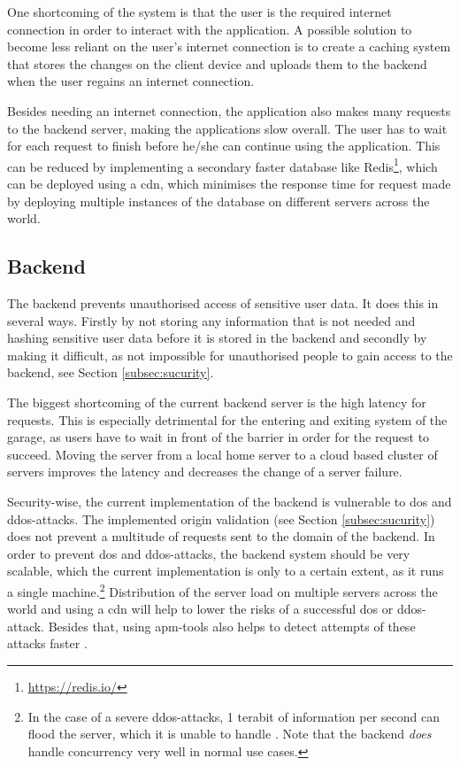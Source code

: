 \ind One shortcoming of the system is that the user is the required internet connection in order to interact with the application. A possible solution to become less reliant on the user's internet connection is to create a caching system that stores the changes on the client device and uploads them to the backend when the user regains an internet connection.

\ind Besides needing an internet connection, the application also makes many requests to the backend server, making the applications slow overall. The user has to wait for each request to finish before he/she can continue using the application. This can be reduced by implementing a secondary faster database like Redis\footnote{\url{https://redis.io/}}, which can be deployed using a \ac{cdn}, which minimises the response time for request made by deploying multiple instances of the database on different servers across the world.

\subsection{Backend}
The backend prevents unauthorised access of sensitive user data. It does this in several ways. Firstly by not storing any information that is not needed and hashing sensitive user data before it is stored in the backend and secondly by making it difficult, as not impossible for unauthorised people to gain access to the backend, see Section \ref{subsec:sucurity}.

\ind The biggest shortcoming of the current backend server is the high latency for requests. This is especially detrimental for the entering and exiting system of the garage, as users have to wait in front of the barrier in order for the request to succeed. Moving the server from a local home server to a cloud based cluster of servers improves the latency and decreases the change of a server failure.

\ind Security-wise, the current implementation of the backend is vulnerable to \ac{dos} and \ac{ddos}-attacks. The implemented origin validation (see Section \ref{subsec:sucurity}) does not prevent a multitude of requests sent to the domain of the backend. In order to prevent \ac{dos} and \ac{ddos}-attacks, the backend system should be very scalable, which the current implementation is only to a certain extent, as it runs a single machine.\footnote{In the case of a severe \ac{ddos}-attacks, 1 terabit of information per second can flood the server, which it is unable to handle \cite{ddos_attack}. Note that the backend \textit{does} handle concurrency very well in normal use cases.} Distribution of the server load on multiple servers across the world and using a \ac{cdn} will help to lower the risks of a successful \ac{dos} or \ac{ddos}-attack. Besides that, using \ac{apm}-tools also helps to detect attempts of these attacks faster \cite{ddos_prevention}.



